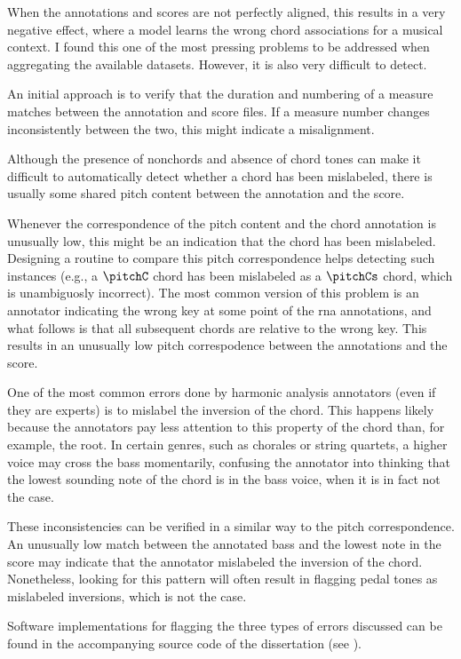 



When the annotations and scores are not perfectly aligned,
this results in a very negative effect, where a model learns
the wrong chord associations for a musical context. I found
this one of the most pressing problems to be addressed when
aggregating the available datasets. However, it is also very
difficult to detect.

An initial approach is to verify that the duration and
numbering of a measure matches between the annotation and
score files. If a measure number changes inconsistently
between the two, this might indicate a misalignment.


Although the presence of \gls{nonchord}s and absence of
chord tones can make it difficult to automatically detect
whether a chord has been mislabeled, there is usually some
shared pitch content between the annotation and the score.

Whenever the correspondence of the pitch content and the
chord annotation is unusually low, this might be an
indication that the chord has been mislabeled. Designing a
routine to compare this pitch correspondence helps detecting
such instances (e.g., a $\pitchC$ chord has been mislabeled
as a $\pitchCs$ chord, which is unambiguosly incorrect). The
most common version of this problem is an annotator
indicating the wrong key at some point of the \gls{rna}
annotations, and what follows is that all subsequent chords
are relative to the wrong key. This results in an unusually
low pitch correspodence between the annotations and the
score.


One of the most common errors done by harmonic analysis
annotators (even if they are experts) is to mislabel the
inversion of the chord. This happens likely because the
annotators pay less attention to this property of the chord
than, for example, the root. In certain genres, such as
chorales or string quartets, a higher voice may cross the
bass momentarily, confusing the annotator into thinking that
the lowest sounding note of the chord is in the bass voice,
when it is in fact not the case.

These inconsistencies can be verified in a similar way to
the pitch correspondence. An unusually low match between the
annotated bass and the lowest note in the score may indicate
that the annotator mislabeled the inversion of the chord.
Nonetheless, looking for this pattern will often result in
flagging pedal tones as mislabeled inversions, which is not
the case.

Software implementations for flagging the three types of
errors discussed can be found in the accompanying source
code of the dissertation (see
).
